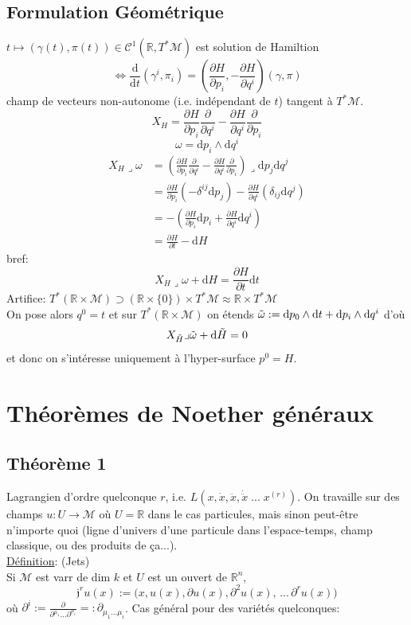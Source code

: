 \documentclass[a4paper,11pt]{article}
\renewcommand{\d}{{\mathrm{d}}}
\newcommand{\dr}[2]{\frac{\partial {#1}}{\partial{#2}}}
\begin{document}
\subsection{Formulation Géométrique}
$t\mapsto (\gamma(t), \pi(t)) \in \mathcal{C}^1(\mathbb{R},T^*\mathcal{M})$ est solution de Hamiltion
$$\iff \frac{\d}{\d t}(\gamma^i, \pi_i) = (\dr H{p_i},-\dr H{q^i})(\gamma,\pi)$$
champ de vecteurs \color{red} non-autonome (i.e. indépendant de $t$) \color{black} tangent à $T^*\mathcal{M}$.
$$X_H = \dr H{p_i} \dr{}{q^i}-\dr H{q^i}\dr{}{p_i}$$
$$\omega = \d p_i \wedge \d q^i$$
\begin{align*}
X_H \lrcorner \omega
&= \left(\dr H{p_i} \dr{}{q^i}-\dr H{q^i}\dr{}{p_i}\right) \lrcorner \d p_j\d q^j\\
&= \dr H {p_i} (-\delta^{ij} \d p_j) - \dr H {q^i}(\delta_{ij}\d q^j)\\
&= - \left(\dr H {p_i} \d p_i + \dr H {q^i} \d q^i\right)\\
&=\dr H t - \d H
\end{align*}
bref:
$$\boxed{X_H \lrcorner \omega + \d H = \dr H t \d t}$$
Artifice: $T^*(\mathbb{R}\times\mathcal{M}) \supset (\mathbb{R}\times\{0\})\times T^*\mathcal{M}\approx\mathbb{R}\times T^*\mathcal{M} $
\\
On pose alors $q^0 = t$ et sur $T^*(\mathbb{R}\times\mathcal{M})$ on étends $\Tilde \omega:= \d p_0 \wedge \d t + \d p_i \wedge \d q^i$ d'où
$$X_{\Tilde H} \lrcorner \Tilde \omega + \d \Tilde H=0$$
et donc on s'intéresse uniquement à l'hyper-surface $p^0 = H$.

\section{Théorèmes de Noether généraux}
\subsection{Théorème 1}
Lagrangien d'ordre quelconque $r$, i.e. $L(x, \dot x, \ddot x, \dot{\ddot x}\;...\; x^{(r)})$. On travaille sur des champs $u:U\to\mathcal{M}$ où $U=\mathbb{R}$ dans le cas particules, mais sinon peut-être n'importe quoi (ligne d'univers d'une particule dans l'espace-temps, champ classique, ou des produits de ça...).
\\
\underline{Définition}: (Jets)\\
Si $\mathcal{M}$ est varr de dim $k$ et $U$ est un ouvert de $\mathbb{R}^n$, 
$$\mathfrak{j}^r u (x) := \Big(x, u(x), \partial u(x), \partial^2 u(x), \,...\, \partial^r u (x)\Big)$$
où $\partial^i := \dr{}{^{\mu_1}...\partial^{\mu_i}} =: \partial_{\mu_1...\mu_i}$. 
Cas général pour des variétés quelconques:
\end{document}
